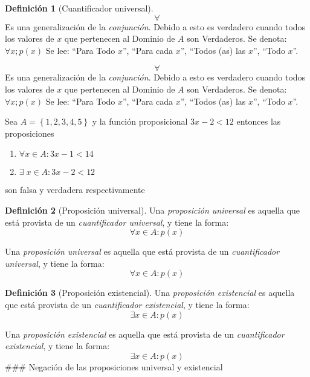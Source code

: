 \documentclass[16pt,]{krantz}
\providecommand{\tightlist}{%
  \setlength{\itemsep}{0pt}\setlength{\parskip}{0pt}}
\theoremstyle{definition}
\newtheorem{definition}{Definición}[chapter]
\theoremstyle{definition}
\theoremstyle{definition}
\theoremstyle{definition}
\theoremstyle{remark}
\begin{document}
\begin{definition}[Cuantificador universal]
\protect\hypertarget{def:universal}{}{\label{def:universal} \iffalse (Cuantificador universal) \fi{} }\[\forall\] Es una generalización de la \emph{conjunción}. Debido a esto es verdadero cuando todos los valores de \(x\) que pertenecen al Dominio de \(A\) son Verdaderos. Se denota: \(\forall x ; p(x)\) Se lee: ``Para Todo \(x\)'', ``Para cada \(x\)'', ``Todos (as) las \(x\)'', ``Todo \(x\)''.
\end{definition}
\[\forall\] Es una generalización de la \emph{conjunción}. Debido a esto es verdadero cuando todos los valores de \(x\) que pertenecen al Dominio de \(A\) son Verdaderos. Se denota: \(\forall x ; p(x)\) Se lee: ``Para Todo \(x\)'', ``Para cada \(x\)'', ``Todos (as) las \(x\)'', ``Todo \(x\)''.

Sea \(A=\left\{1,2,3,4,5\right\}\) y la función proposicional \(3x-2<12\) entonces las proposiciones

\begin{enumerate}
\def\labelenumi{\arabic{enumi}.}
\tightlist
\item
  \(\forall x\in A:3x-1<14\)
\item
  \(\exists\; x\in A:3x-2<12\)
\end{enumerate}

son falsa y verdadera respectivamente

\begin{definition}[Proposición universal]
\protect\hypertarget{def:universal2}{}{\label{def:universal2} \iffalse (Proposición universal) \fi{} }Una \emph{proposición universal} es aquella que está provista de un \emph{cuantificador universal}, y tiene la forma: \[\forall x\in A:p(x)\]
\end{definition}

Una \emph{proposición universal} es aquella que está provista de un \emph{cuantificador universal}, y tiene la forma: \[\forall x\in A:p(x)
\]

\begin{definition}[Proposición existencial]
\protect\hypertarget{def:existencial2}{}{\label{def:existencial2} \iffalse (Proposición existencial) \fi{} }Una \emph{proposición existencial} es aquella que está provista de un \emph{cuantificador existencial}, y tiene la forma: \[\exists x\in A:p(x)\]
\end{definition}

Una \emph{proposición existencial} es aquella que está provista de un \emph{cuantificador existencial}, y tiene la forma: \[\exists x\in A:p(x)\]
\#\#\# Negación de las proposiciones universal y existencial
\end{document}
